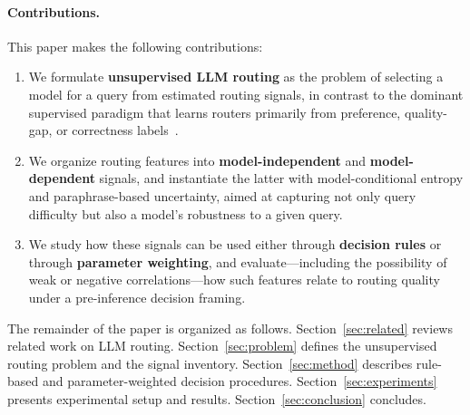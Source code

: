 \paragraph{Contributions.}
This paper makes the following contributions:
\begin{enumerate}
    \item We formulate \textbf{unsupervised LLM routing} as the problem of selecting a model for a query from estimated routing signals, in contrast to the dominant supervised paradigm that learns routers primarily from preference, quality-gap, or correctness labels~\cite{ong2025routellm,ding2024hybrid,song2025irt,wang2025mixllm,wang2025icl,zhang2025uncertainty}.
    \item We organize routing features into \textbf{model-independent} and \textbf{model-dependent} signals, and instantiate the latter with model-conditional entropy and paraphrase-based uncertainty, aimed at capturing not only query difficulty but also a model's robustness to a given query.
    \item We study how these signals can be used either through \textbf{decision rules} or through \textbf{parameter weighting}, and evaluate---including the possibility of weak or negative correlations---how such features relate to routing quality under a pre-inference decision framing.
\end{enumerate}

The remainder of the paper is organized as follows.
Section~\ref{sec:related} reviews related work on LLM routing.
Section~\ref{sec:problem} defines the unsupervised routing problem and the signal inventory.
Section~\ref{sec:method} describes rule-based and parameter-weighted decision procedures.
Section~\ref{sec:experiments} presents experimental setup and results.
Section~\ref{sec:conclusion} concludes.
